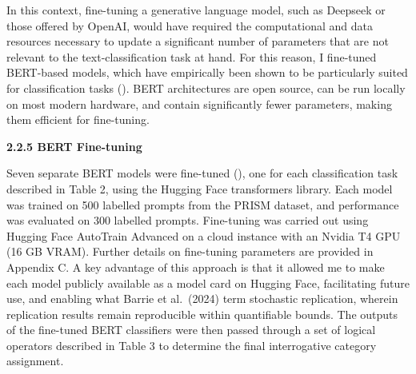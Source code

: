 \documentclass[
  12pt,
]{article}
\begin{document}
In this context, fine-tuning a generative language model, such as Deepseek or those offered by OpenAI, would have required the computational and data resources necessary to update a significant number of parameters that are not relevant to the text-classification task at hand. For this reason, I fine-tuned BERT-based models, which have empirically been shown to be particularly suited for classification tasks (). BERT architectures are open source, can be run locally on most modern hardware, and contain significantly fewer parameters, making them efficient for fine-tuning.

\textbf{2.2.5 BERT Fine-tuning}

Seven separate BERT models were fine-tuned (), one for each classification task described in Table 2, using the Hugging Face transformers library. Each model was trained on 500 labelled prompts from the PRISM dataset, and performance was evaluated on 300 labelled prompts. Fine-tuning was carried out using Hugging Face AutoTrain Advanced on a cloud instance with an Nvidia T4 GPU (16 GB VRAM). Further details on fine-tuning parameters are provided in Appendix C. A key advantage of this approach is that it allowed me to make each model publicly available as a model card on Hugging Face, facilitating future use, and enabling what Barrie et al.~(2024) term stochastic replication, wherein replication results remain reproducible within quantifiable bounds. The outputs of the fine-tuned BERT classifiers were then passed through a set of logical operators described in Table 3 to determine the final interrogative category assignment.
\end{document}
